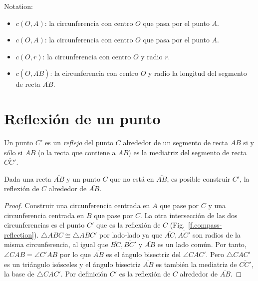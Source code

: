 \noindent{}Notation:
\begin{itemize}
\item $c(O,A)$: la circunferencia con centro $O$ que pasa por el punto $A$.
\item $c(O,A)$: la circunferencia con centro $O$ que pasa por el punto $A$.
\item $c(O,r)$: la circunferencia con centro $O$ y radio $r$.
\item $c(O,\overline{AB})$: la circunferencia con centro $O$ y radio la longitud del segmento de recta $\overline{AB}$.
\end{itemize}


\section{Reflexión de un punto}\label{s.reflection}

\begin{definition}
Un punto $C'$ es un \emph{reflejo} del punto $C$ alrededor de un segmento de recta $\overline{AB}$ si y sólo si $\overline{AB}$ (o la recta que contiene a $\overline{AB}$) es la mediatriz del segmento de recta $\overline{CC'}$.
\end{definition}

\begin{theorem}\label{thm.compass-reflection}
Dada una recta $\overline{AB}$ y un punto $C$ que no está en $\overline{AB}$, es posible construir $C'$, la reflexión de $C$ alrededor de $\overline{AB}$.
\end{theorem}

\begin{proof} 
Construir una circunferencia centrada en $A$ que pase por $C$ y una circunferencia centrada en $B$ que pase por $C$. La otra intersección de las dos circunferencias es el punto $C'$ que es la reflexión de $C$ (Fig.~\ref{f.compass-reflection}).
$\triangle ABC \cong \triangle ABC'$ por lado-lado ya que $\overline{AC}, \overline{AC'}$ son radios de la misma circunferencia, al igual que $\overline{BC}, \overline{BC'}$ y $\overline{AB}$ es un lado común. Por tanto, $\angle CAB = \angle C'AB$ por lo que $\overline{AB}$ es el ángulo bisectriz del $\angle CAC'$. Pero $\triangle CAC'$ es un triángulo isósceles y el ángulo bisectriz $\overline{AB}$ es también la mediatriz de $\overline{CC'}$, la base de $\triangle CAC'$. Por definición $C'$ es la reflexión de $C$ alrededor de $\overline{AB}$.
\end{proof}

